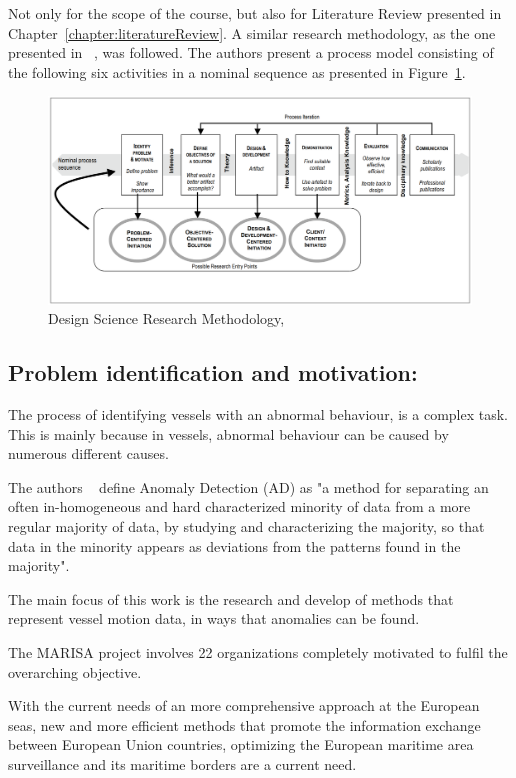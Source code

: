 Not only for the scope of the course, but also for Literature Review presented in Chapter~\ref{chapter:literatureReview}. A similar research methodology, as the one presented in ~\cite{Peffers2007}, was followed.
The authors present a process model consisting of the following six activities in a nominal sequence as presented in Figure~\ref{fig:DSRMPeffers}.

\begin{figure}[H]
	\includegraphics[width=\linewidth]{figures/DSRMPeffers.PNG}
    \caption{Design Science Research Methodology, ~\cite{Peffers2007}}
    \label{fig:DSRMPeffers}
\end{figure}

\subsection{Problem identification and motivation:} 
The process of identifying vessels with an abnormal behaviour, is a complex task. This is mainly because in vessels, abnormal behaviour can be caused by numerous different causes.
  
The authors ~\cite{Laxhammar2008} define Anomaly Detection (AD) as "a method for separating an often in-homogeneous and hard characterized minority of data from a more regular majority of data, by studying and characterizing the majority, so that data in the minority appears as deviations from the patterns found in the majority". 

The main focus of this work is the research and develop of methods that represent vessel motion data, in ways that anomalies can be found.

The MARISA project involves 22 organizations completely motivated to fulfil the overarching objective. 

With the current needs of an more comprehensive approach at the European seas, new and more efficient methods that promote the information exchange between European Union countries, optimizing the European maritime area surveillance and its maritime borders are a current need.

